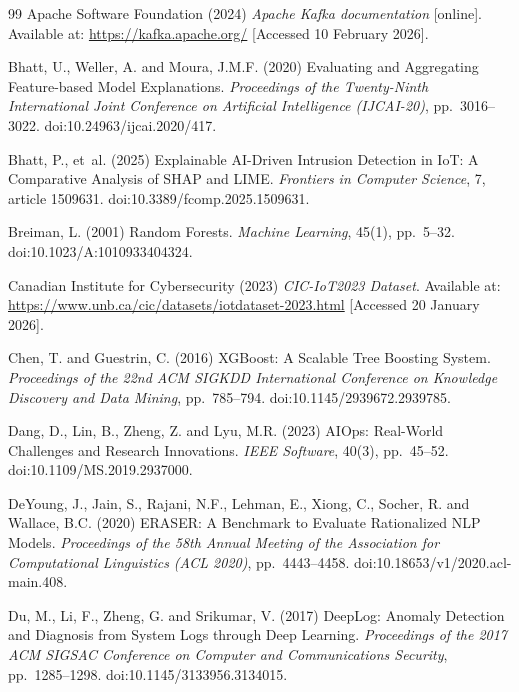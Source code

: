 \documentclass[12pt,a4paper]{report}
\begin{document}
\begin{thebibliography}{99}
Apache Software Foundation (2024) \textit{Apache Kafka documentation} [online]. Available at: \url{https://kafka.apache.org/} [Accessed 10 February 2026].

Bhatt, U., Weller, A. and Moura, J.M.F. (2020) Evaluating and Aggregating Feature-based Model Explanations. \textit{Proceedings of the Twenty-Ninth International Joint Conference on Artificial Intelligence (IJCAI-20)}, pp.~3016--3022. doi:10.24963/ijcai.2020/417.

Bhatt, P., et~al. (2025) Explainable AI-Driven Intrusion Detection in IoT: A Comparative Analysis of SHAP and LIME. \textit{Frontiers in Computer Science}, 7, article 1509631. doi:10.3389/fcomp.2025.1509631.

Breiman, L. (2001) Random Forests. \textit{Machine Learning}, 45(1), pp.~5--32. doi:10.1023/A:1010933404324.

Canadian Institute for Cybersecurity (2023) \textit{CIC-IoT2023 Dataset}. Available at: \url{https://www.unb.ca/cic/datasets/iotdataset-2023.html} [Accessed 20 January 2026].

Chen, T. and Guestrin, C. (2016) XGBoost: A Scalable Tree Boosting System. \textit{Proceedings of the 22nd ACM SIGKDD International Conference on Knowledge Discovery and Data Mining}, pp.~785--794. doi:10.1145/2939672.2939785.

Dang, D., Lin, B., Zheng, Z. and Lyu, M.R. (2023) AIOps: Real-World Challenges and Research Innovations. \textit{IEEE Software}, 40(3), pp.~45--52. doi:10.1109/MS.2019.2937000.


DeYoung, J., Jain, S., Rajani, N.F., Lehman, E., Xiong, C., Socher, R. and Wallace, B.C. (2020) ERASER: A Benchmark to Evaluate Rationalized NLP Models. \textit{Proceedings of the 58th Annual Meeting of the Association for Computational Linguistics (ACL 2020)}, pp.~4443--4458. doi:10.18653/v1/2020.acl-main.408.

Du, M., Li, F., Zheng, G. and Srikumar, V. (2017) DeepLog: Anomaly Detection and Diagnosis from System Logs through Deep Learning. \textit{Proceedings of the 2017 ACM SIGSAC Conference on Computer and Communications Security}, pp.~1285--1298. doi:10.1145/3133956.3134015.


\end{thebibliography}
\end{document}
